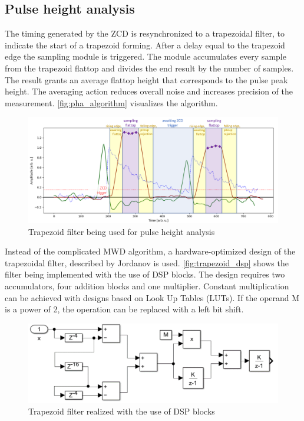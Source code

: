 \subsection{Pulse height analysis}

The timing generated by the ZCD is resynchronized to a trapezoidal filter, 
to indicate the start of a trapezoid forming. After a delay equal to the 
trapezoid edge the sampling module is triggered. The module
accumulates every sample from the trapezoid flattop and 
divides the end result by the number of samples.
The result grants an average flattop height that corresponds
to the pulse peak height. The averaging action reduces overall noise
and increases precision of the measurement.
\autoref{fig:pha_algorithm} visualizes the algorithm.

\begin{figure}[H]
  \centering
  \includegraphics[width=\linewidth]{media/pha_algorithm.png}
  \caption{Trapezoid filter being used for pulse height analysis}
  \label{fig:pha_algorithm} 
\end{figure}


Instead of the complicated MWD algorithm, a hardware-optimized 
design of the trapezoidal filter, described by Jordanov \cite{jordanov_trapezoidal}
is used. \autoref{fig:trapezoid_dsp} shows the filter being 
implemented with the use of DSP blocks. The design requires two 
accumulators, four addition blocks and one multiplier.
Constant multiplication can be achieved with designs
based on Look Up Tables (LUTs). If the operand M is a power of 2,
the operation can be replaced with a left bit shift.
\begin{figure}[H]
  \centering
  \includegraphics[width=\linewidth]{media/trapezoid_dsp.png}
  \caption{Trapezoid filter realized with the use of DSP blocks}
  \label{fig:trapezoid_dsp} 
\end{figure}



